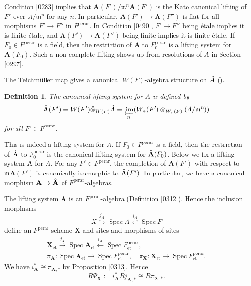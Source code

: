 \documentclass{amsart}
\newtheorem{Def}[Thm]{Definition}
\theoremstyle{remark}
\numberwithin{equation}{subsection}
\newcommand{\into}{\hookrightarrow}
\newcommand{\tensor}{\mathbin{\otimes}}
\newcommand{\et}{\mathrm{et}}
\newcommand{\invlim}{\varprojlim}
\newcommand{\perar}{\mathrm{perar}}
\newcommand{\alg}[1]{\mathbf{#1}}
\newcommand{\ideal}[1]{\mathfrak{#1}}
\DeclareMathOperator{\Spec}{Spec}
\begin{document}
Condition \ref{0283} implies that $\alg{A}(F') / \ideal{m}^{n} \alg{A}(F')$
is the Kato canonical lifting of $F'$ over $A / \ideal{m}^{n}$ for any $n$.
In particular, $\alg{A}(F') \to \alg{A}(F'')$ is flat for all morphisms $F' \to F''$ in $F^{\perar}$.
In Condition \ref{0490}, $F' \to F''$ being \'etale implies it is finite \'etale,
and $\alg{A}(F') \to \alg{A}(F'')$ being finite implies it is finite \'etale.
If $F_{0} \in F^{\perar}$ is a field,
then the restriction of $\alg{A}$ to $F_{0}^{\perar}$ is a lifting system for $\alg{A}(F_{0})$.
Such a non-complete lifting shows up from resolutions of $A$ in Section \ref{0297}.

The Teichm\"uller map gives a canonical $W(F)$-algebra structure on $\Hat{A}$
(\cite[Chapter V, Section 4, Theorem 2.1]{DG70b}).

\begin{Def} \label{0285}
	The \emph{canonical lifting system} for $A$ is defined by
		\[
				\Hat{\alg{A}}(F')
			=
				W(F') \Hat{\tensor}_{W(F)} \Hat{A}
			=
				\invlim_{n}
					(W_{n}(F') \tensor_{W_{n}(F)} (A / \ideal{m}^{n}))
		\]
	for all $F' \in F^{\perar}$.
\end{Def}

This is indeed a lifting system for $A$.
If $F_{0} \in F^{\perar}$ is a field,
then the restriction of $\Hat{\alg{A}}$ to $F_{0}^{\perar}$
is the canonical lifting system for $\Hat{\alg{A}}(F_{0})$.
Below we fix a lifting system $\alg{A}$ for $A$.
For any $F' \in F^{\perar}$,
the completion of $\alg{A}(F')$ with respect to $\ideal{m} \alg{A}(F')$
is canonically isomorphic to $\Hat{\alg{A}}(F')$.
In particular, we have a canonical morphism
$\alg{A} \to \Hat{\alg{A}}$ of $F^{\perar}$-algebras.

The lifting system $\alg{A}$ is an $F^{\perar}$-algebra
(Definition \ref{0312}).
Hence the inclusion morphisms
	\[
			X
		\stackrel{j_{A}}{\into}
			\Spec A
		\stackrel{i_{A}}{\hookleftarrow}
			\Spec F
	\]
define an $F^{\perar}$-scheme $\alg{X}$ and sites and morphisms of sites
	\begin{gather*}
				\alg{X}_{\et}
			\stackrel{j_{\alg{A}}}{\to}
				\Spec \alg{A}_{\et}
			\stackrel{i_{\alg{A}}}{\gets}
				\Spec F^{\perar}_{\et},
		\\
				\pi_{\alg{A}}
			\colon
				\Spec \alg{A}_{\et}
			\to
				\Spec F^{\perar}_{\et},
			\quad
				\pi_{\alg{X}}
			\colon
				\alg{X}_{\et}
			\to
				\Spec F^{\perar}_{\et}.
	\end{gather*}
We have $i_{\alg{A}}^{\ast} \cong \pi_{\alg{A}, \ast}$
by Proposition \ref{0313}.
Hence
	\[
			R \Psi_{\alg{X}}
		:=
			i_{\alg{A}}^{\ast} R j_{\alg{A}, \ast}
		\cong
			R \pi_{\alg{X}, \ast}.
	\]
\end{document}
